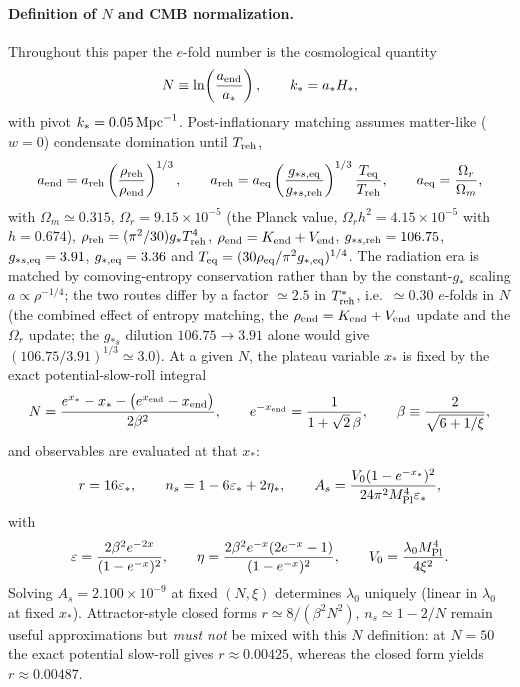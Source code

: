 \documentclass[pdflatex,sn-mathphys-num]{sn-jnl}
\newcommand{\MP}{M_{\rm Pl}}
\theoremstyle{thmstyleone}
\begin{document}
\paragraph{Definition of $N$ and CMB normalization.} Throughout this paper the $e$-fold number is the cosmological quantity
\begin{equation}
N\equiv\ln\!\left(\frac{a_{\rm end}}{a_*}\right),
\qquad
k_*=a_*H_*,
\label{eq:Ndef}
\end{equation}
with pivot $k_*=0.05\,{\rm Mpc}^{-1}$. Post-inflationary matching assumes matter-like ($w=0$) condensate domination until $T_{\rm reh}$,
\begin{equation}
a_{\rm end}=a_{\rm reh}\left(\frac{\rho_{\rm reh}}{\rho_{\rm end}}\right)^{1/3},
\qquad
a_{\rm reh}=a_{\rm eq}\left(\frac{g_{*s,\rm eq}}{g_{*s,\rm reh}}\right)^{1/3}\frac{T_{\rm eq}}{T_{\rm reh}},
\qquad
a_{\rm eq}=\frac{\Omega_r}{\Omega_m},
\label{eq:matchN}
\end{equation}
with $\Omega_m\simeq0.315$, $\Omega_r=9.15\times10^{-5}$ (the Planck value, $\Omega_r h^2=4.15\times10^{-5}$ with $h=0.674$), $\rho_{\rm reh}=(\pi^2/30)g_*T_{\rm reh}^4$, $\rho_{\rm end}=K_{\rm end}+V_{\rm end}$, $g_{*s,\rm reh}=106.75$, $g_{*s,\rm eq}=3.91$, $g_{*,\rm eq}=3.36$ and $T_{\rm eq}=(30\rho_{\rm eq}/\pi^2g_{*,\rm eq})^{1/4}$. The radiation era is matched by comoving-entropy conservation rather than by the constant-$g_*$ scaling $a\propto\rho^{-1/4}$; the two routes differ by a factor $\simeq2.5$ in $T_{\rm reh}^*$, i.e.\ $\simeq0.30$ $e$-folds in $N$ (the combined effect of entropy matching, the $\rho_{\rm end}=K_{\rm end}+V_{\rm end}$ update and the $\Omega_r$ update; the $g_{*s}$ dilution $106.75\to3.91$ alone would give $(106.75/3.91)^{1/3}\simeq3.0$). At a given $N$, the plateau variable $x_*$ is fixed by the exact potential-slow-roll integral
\begin{equation}
N=\frac{e^{x_*}-x_*-\bigl(e^{x_{\rm end}}-x_{\rm end}\bigr)}{2\beta^2},
\qquad
e^{-x_{\rm end}}=\frac{1}{1+\sqrt2\,\beta},
\qquad
\beta\equiv\frac{2}{\sqrt{6+1/\xi}},
\label{eq:Nint}
\end{equation}
and observables are evaluated at that $x_*$:
\begin{equation}
r=16\varepsilon_*,
\qquad
n_s=1-6\varepsilon_*+2\eta_*,
\qquad
A_s=\frac{V_0(1-e^{-x_*})^2}{24\pi^2\MP^4\varepsilon_*},
\label{eq:obsPS}
\end{equation}
with
\begin{equation}
\varepsilon=\frac{2\beta^2e^{-2x}}{(1-e^{-x})^2},
\qquad
\eta=\frac{2\beta^2e^{-x}(2e^{-x}-1)}{(1-e^{-x})^2},
\qquad
V_0=\frac{\lambda_0\MP^4}{4\xi^2}.
\end{equation}
Solving $A_s=2.100\times10^{-9}$ at fixed $(N,\xi)$ determines $\lambda_0$ uniquely (linear in $\lambda_0$ at fixed $x_*$). Attractor-style closed forms $r\simeq8/(\beta^2N^2)$, $n_s\simeq1-2/N$ remain useful approximations but \emph{must not} be mixed with this $N$ definition: at $N=50$ the exact potential slow-roll gives $r\approx0.00425$, whereas the closed form yields $r\approx0.00487$.
\end{document}
